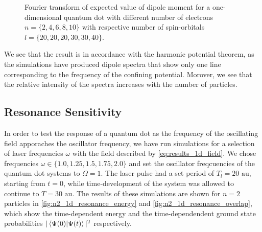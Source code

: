 \begin{figure}
    \centering
    \caption{Fourier transform of expected value of dipole moment for 
        a one-dimensional quantum dot with different number of electrons
        $n=\{2,4,6,8,10\}$ with respective number of spin-orbitals 
        $l=\{20,20,20,30,30,40\}$.
    }
    \label{fig:1d_dipole_spectra}
\end{figure}

We see that the result is in accordance with the harmonic potential theorem, as the 
simulations have produced dipole spectra that show only one line corresponding to the 
frequency of the confining potential. Morover, we see that the relative intensity of 
the spectra increases with the number of particles.

\subsection{Resonance Sensitivity}

In order to test the response of a quantum dot as the frequency of the oscillating 
field apporaches the oscillator frequency, we have run simulations for a selection 
of laser frequencies $\omega$ with the field described by \autoref{eq:results_1d_field}.
We chose frequencies $\omega\in\{1.0, 1.25, 1.5, 1.75, 2.0\}$ and set the 
oscillator freqcuencies of the quantum dot systems to $\Omega=1$. The laser pulse 
had a set period of $T_l=20 \text{ au}$, starting from $t=0$, while time-development 
of the system was allowed to continue to $T=30 \text{ au}$. The results of these 
simulations are shown for $n=2$ particles in \autoref{fig:n2_1d_resonance_energy}
and \autoref{fig:n2_1d_resonance_overlap}, which show the time-dependent energy 
and the time-dependendent ground state probabilities
$|\braket{\Psi(0)}{\Psi(t)}|^2$ respectively.

